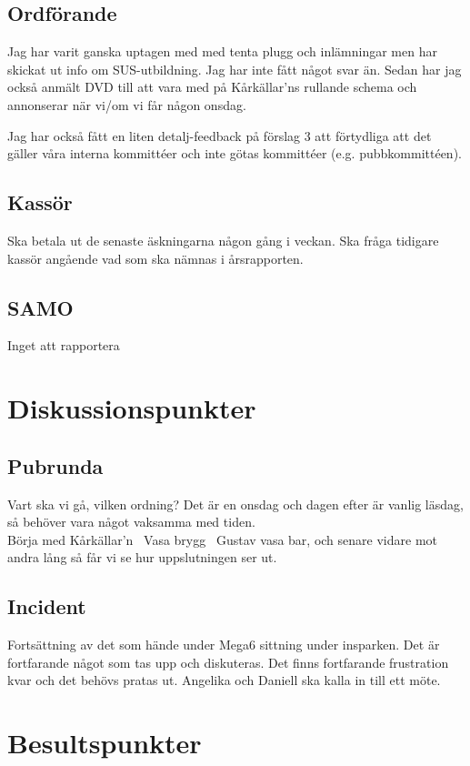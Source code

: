 \documentclass[protokoll]{dvd}
\begin{document}
\subsection{Ordförande}
Jag har varit ganska uptagen med med tenta plugg och inlämningar men har skickat ut info om SUS-utbildning. Jag har inte fått något svar än. Sedan har jag också anmält DVD till att vara med på Kårkällar'ns rullande schema och annonserar när vi/om vi får någon onsdag. 

Jag har också fått en liten detalj-feedback på förslag 3 att förtydliga att det gäller våra interna kommittéer och inte götas kommittéer (e.g. pubbkommittéen). 


\subsection{Kassör}
Ska betala ut de senaste äskningarna någon gång i veckan. Ska fråga tidigare
kassör angående vad som ska nämnas i årsrapporten.


\subsection{SAMO}
Inget att rapportera


\newpage


\section{Diskussionspunkter}
\subsection*{Pubrunda}
Vart ska vi gå, vilken ordning? Det är en onsdag och dagen efter är vanlig läsdag, så behöver vara något vaksamma med tiden.\\ 

Börja med Kårkällar'n \textrightarrow\ Vasa brygg \textrightarrow\ Gustav vasa bar, och senare vidare mot andra lång så får vi se hur uppslutningen ser ut.

\subsection*{Incident}
Fortsättning av det som hände under Mega6 sittning under insparken. Det är
fortfarande något som tas upp och diskuteras. Det finns fortfarande frustration kvar och det
behövs pratas ut. Angelika och Daniell ska kalla in till ett möte.

\section{Besultspunkter}
\end{document}
